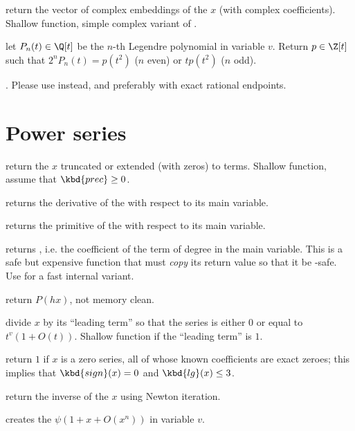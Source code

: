  return the vector of complex
embeddings of the  $x$ (with complex coefficients). Shallow
function, simple complex variant of .

 let $P_n(t)\in \Q[t]$
be the $n$-th Legendre polynomial in variable $v$. Return $p\in \Z[t]$
such that $2^n P_n(t) = p(t^2)$ ($n$ even) or $t p(t^2)$ ($n$ odd).


. Please use 
instead, and preferably  with exact rational endpoints.

\section{Power series}

 return the  $x$ truncated
or extended (with zeros) to  terms. Shallow function, assume
that $\kbd{prec} \geq 0$.

 returns the derivative of the  
with respect to its main variable.

 returns the primitive of the  
with respect to its main variable.

 returns , i.e.
the coefficient of the term of degree  in the main variable. This is a
safe but expensive function that must \emph{copy} its return value so that it
be -safe. Use  for a fast internal variant.

 return $P(h x)$, not memory clean.

 divide $x$ by its ``leading term'' so that
the series is either $0$ or equal to $t^v(1+O(t))$. Shallow function if the
``leading term'' is $1$.

 return $1$ if $x$ is a zero series, all
of whose known coefficients are exact zeroes; this implies that
$\kbd{sign}(x) = 0$ and $\kbd{lg}(x) \leq 3$.

 return the inverse of the  $x$ using
Newton iteration.

 creates the 
$\psi(1 + x + O(x^n))$ in variable $v$.

